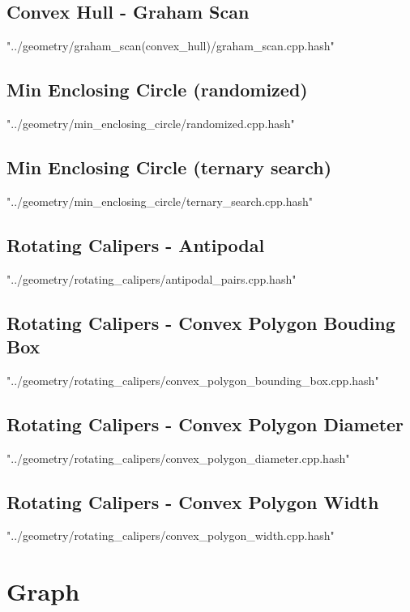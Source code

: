 \documentclass [12pt,onecolumn,oneside]{article}
\begin{document}
\subsection{ Convex Hull - Graham Scan}
 {"../geometry/graham_scan(convex_hull)/graham_scan.cpp.hash"}
\newpage

\subsection{ Min Enclosing Circle (randomized)}
 {"../geometry/min_enclosing_circle/randomized.cpp.hash"}
\newpage

\subsection{ Min Enclosing Circle (ternary search)}
 {"../geometry/min_enclosing_circle/ternary_search.cpp.hash"}
\newpage

\subsection{ Rotating Calipers - Antipodal}
 {"../geometry/rotating_calipers/antipodal_pairs.cpp.hash"}
\newpage

\subsection{ Rotating Calipers - Convex Polygon Bouding Box}
 {"../geometry/rotating_calipers/convex_polygon_bounding_box.cpp.hash"}
\newpage

\subsection{ Rotating Calipers - Convex Polygon Diameter}
 {"../geometry/rotating_calipers/convex_polygon_diameter.cpp.hash"}
\newpage

\subsection{ Rotating Calipers - Convex Polygon Width}
 {"../geometry/rotating_calipers/convex_polygon_width.cpp.hash"}
\newpage


\section{Graph}
\end{document}
